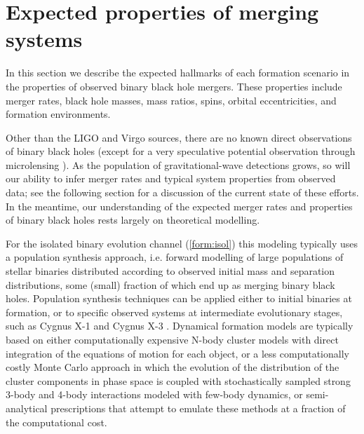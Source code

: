 \documentclass[iop,onecolumn]{revtex4}
\begin{document}


\section{Expected properties of merging systems}\label{merge}

In this section we describe the expected hallmarks of each formation scenario in the properties of observed binary black hole mergers. These properties include merger rates, black hole masses, mass ratios, spins, orbital eccentricities, and formation environments.

Other than the LIGO and Virgo sources, there are no known direct observations of binary black holes (except for a very speculative potential observation through microlensing \citep{Dong:2007}). As the population of gravitational-wave detections grows, so will our ability to infer merger rates and typical system properties from observed data; see the following section for a discussion of the current state of these efforts. In the meantime, our understanding of the expected merger rates and properties of binary black holes rests largely on theoretical modelling. 

For the isolated binary evolution channel (\autoref{form:isol}) this modeling typically uses a population synthesis approach, i.e. forward modelling of large populations of stellar binaries distributed according to observed initial mass and separation distributions, some (small) fraction of which end up as merging binary black holes. Population synthesis techniques can be applied either to initial binaries at formation, or to specific observed systems at intermediate evolutionary stages, such as Cygnus X-1 \citep{Bulik:2008} and Cygnus X-3 \citep{CygnusX3:2012}.  Dynamical formation models are typically based on either computationally expensive N-body cluster models with direct integration of the equations of motion for each object, or a less computationally costly Monte Carlo approach in which the evolution of the distribution of the cluster components in phase space is coupled with stochastically sampled strong 3-body and 4-body interactions modeled with few-body dynamics, or semi-analytical prescriptions that attempt to emulate these methods at a fraction of the computational cost. 
\end{document}
